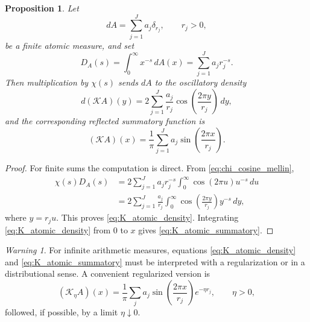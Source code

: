 \documentclass[11pt]{amsart}
\numberwithin{equation}{section}
\theoremstyle{plain}
\newtheorem{proposition}[theorem]{Proposition}
\theoremstyle{definition}
\theoremstyle{remark}
\newtheorem{warning}[theorem]{Warning}
\begin{document}
\begin{proposition}
\label{prop:atomic_K_transform_finite}
Let
\begin{equation}
dA=\sum_{j=1}^{J}a_j\delta_{r_j},
\qquad r_j>0,
\label{eq:finite_atomic_measure}
\end{equation}
be a finite atomic measure, and set
\begin{equation}
D_A(s)=\int_0^\infty x^{-s}\,dA(x)=\sum_{j=1}^{J}a_jr_j^{-s}.
\label{eq:finite_atomic_dirichlet_mellin}
\end{equation}
Then multiplication by \(\chi(s)\) sends \(dA\) to the oscillatory density
\begin{equation}
d(\mathcal K A)(y)=2\sum_{j=1}^{J}\frac{a_j}{r_j}\cos\left(\frac{2\pi y}{r_j}\right)\,dy,
\label{eq:K_atomic_density}
\end{equation}
and the corresponding reflected summatory function is
\begin{equation}
(\mathcal K A)(x)=\frac1\pi\sum_{j=1}^{J}a_j\sin\left(\frac{2\pi x}{r_j}\right).
\label{eq:K_atomic_summatory}
\end{equation}
\end{proposition}

\begin{proof}
For finite sums the computation is direct.  From \eqref{eq:chi_cosine_mellin},
\begin{align}
\chi(s)D_A(s)
&=2\sum_{j=1}^{J}a_jr_j^{-s}\int_0^\infty \cos(2\pi u)u^{-s}\,du
\label{eq:chi_DA_first_step}\\
&=2\sum_{j=1}^{J}\frac{a_j}{r_j}\int_0^\infty \cos\left(\frac{2\pi y}{r_j}\right)y^{-s}\,dy,
\label{eq:chi_DA_change_variable}
\end{align}
where \(y=r_ju\).  This proves \eqref{eq:K_atomic_density}.  Integrating \eqref{eq:K_atomic_density} from \(0\) to \(x\) gives \eqref{eq:K_atomic_summatory}.
\end{proof}

\begin{warning}
\label{warn:infinite_atomic_regularization}
For infinite arithmetic measures, equations \eqref{eq:K_atomic_density} and \eqref{eq:K_atomic_summatory} must be interpreted with a regularization or in a distributional sense.  A convenient regularized version is
\begin{equation}
(\mathcal K_\eta A)(x)=\frac1\pi\sum_j a_j\sin\left(\frac{2\pi x}{r_j}\right)e^{-\eta r_j},
\qquad \eta>0,
\label{eq:K_eta_regularized_atomic_sum}
\end{equation}
followed, if possible, by a limit \(\eta\downarrow0\).
\end{warning}
\end{document}
